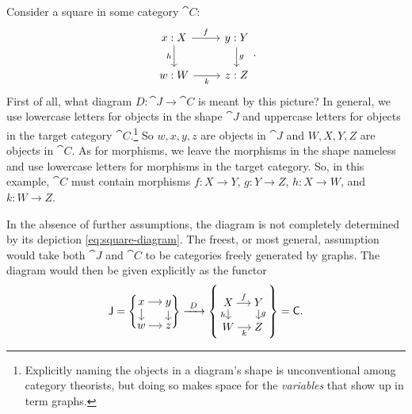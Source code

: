 \documentclass[11pt]{article}
\numberwithin{equation}{section}
\begin{document}
\begin{example}
  Consider a square in some category $\cat{C}$:
  \begin{equation}
    \label{eq:square-diagram}
    \begin{tikzcd}
      {x: X} & {y: Y} \\
      {w: W} & {z:Z}
      \arrow["f", from=1-1, to=1-2]
      \arrow["h"', from=1-1, to=2-1]
      \arrow["g", from=1-2, to=2-2]
      \arrow["k"', from=2-1, to=2-2]
    \end{tikzcd}.
  \end{equation}
  First of all, what diagram $D: \cat{J} \to \cat{C}$ is meant by this picture? In
  general, we use lowercase letters for objects in the shape $\cat{J}$ and
  uppercase letters for objects in the target category
  $\cat{C}$.\footnote{Explicitly naming the objects in a diagram's shape is
    unconventional among category theorists, but doing so makes space for the
    \emph{variables} that show up in term graphs.} So $w,x,y,z$ are objects in
  $\cat{J}$ and $W,X,Y,Z$ are objects in $\cat{C}$. As for morphisms, we leave
  the morphisms in the shape nameless and use lowercase letters for morphisms in
  the target category. So, in this example, $\cat{C}$ must contain morphisms
  $f: X \to Y$, $g: Y \to Z$, $h: X \to W$, and $k: W \to Z$.

  In the absence of further assumptions, the diagram is not completely
  determined by its depiction \eqref{eq:square-diagram}. The freest, or most
  general, assumption would take both $\cat{J}$ and $\cat{C}$ to be categories
  freely generated by graphs. The diagram would then be given explicitly as the
  functor
  \begin{equation*}
    \cat{J} = \left\{
      \begin{tikzcd}[cramped, sep=small]
        x & y \\
        w & z
        \arrow[from=1-1, to=1-2]
        \arrow[from=1-1, to=2-1]
        \arrow[from=1-2, to=2-2]
        \arrow[from=2-1, to=2-2]
      \end{tikzcd}
    \right\}
    \xto{\ D\ }
    \left\{
      \begin{tikzcd}[cramped, sep=small]
        X & Y \\
        W & Z
        \arrow["f", from=1-1, to=1-2]
        \arrow["h"', from=1-1, to=2-1]
        \arrow["g", from=1-2, to=2-2]
        \arrow["k"', from=2-1, to=2-2]
      \end{tikzcd}
    \right\} = \cat{C}.
  \end{equation*}


\end{example}
\end{document}
